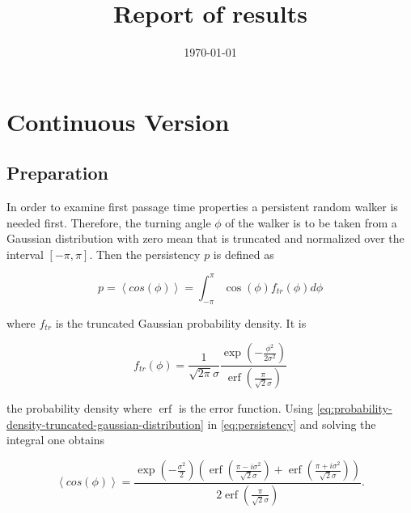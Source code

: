 \documentclass[]{scrartcl}
\title{Report of results}
\date{\today}
\DeclareMathOperator\erf{erf}
\begin{document}
\maketitle

\section{Continuous Version}
\label{sec:cont}

\subsection{Preparation}
\label{ssec:cont-prep}

In order to examine first passage time properties a persistent random walker is needed first. Therefore, the turning angle $\phi$ of the walker is to be taken from a Gaussian distribution with zero mean that is truncated and normalized over the interval $\left[-\pi, \pi\right]$. Then the persistency $p$ is defined as

\begin{equation}
 \label{eq:persistency}
 p = \left\langle cos\left(\phi\right)\right\rangle = \int_{-\pi}^{\pi} \cos\left(\phi\right) f_{tr}\left(\phi\right) d\phi
\end{equation}

where $f_{tr}$ is the truncated Gaussian probability density. It is

\begin{equation}
 \label{eq:probability-density-truncated-gaussian-distribution}
 f_{tr}\left(\phi\right) = \frac{1}{\sqrt{2\pi}\sigma} \frac{\exp\left(-\frac{\phi^2}{2\sigma^2}\right)}{\erf\left(\frac{\pi}{\sqrt{2}\sigma}\right)}
\end{equation}

the probability density where $\erf$ is the error function. Using \eqref{eq:probability-density-truncated-gaussian-distribution} in \eqref{eq:persistency} and solving the integral one obtains

\begin{equation}
 \label{eq:avg-cosine}
 \left\langle cos\left(\phi\right)\right\rangle = \frac{\exp\left(-\frac{\sigma^2}{2}\right)\left(\erf\left(\frac{\pi - i \sigma^2}{\sqrt{2}\sigma}\right) + \erf\left(\frac{\pi + i \sigma^2}{\sqrt{2}\sigma}\right)\right)}{2\erf\left(\frac{\pi}{\sqrt{2}\sigma}\right)}.
\end{equation}
\end{document}
